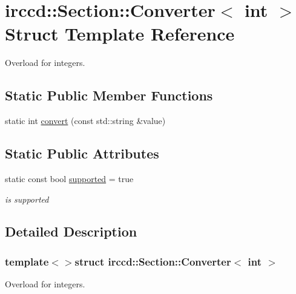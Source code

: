 \hypertarget{a00021}{\section{irccd\-:\-:Section\-:\-:Converter$<$ int $>$ Struct Template Reference}
\label{a00021}
}


Overload for integers.  


\subsection*{Static Public Member Functions}
\begin{DoxyCompactItemize}
\item 
static int \hyperlink{a00021_a17d70ca5872efcbf9d564b29b2ad56dd}{convert} (const std\-::string \&value)
\end{DoxyCompactItemize}
\subsection*{Static Public Attributes}
\begin{DoxyCompactItemize}
\item 
\hypertarget{a00021_a31c6c8933a03ab86a36f37c14e545ce6}{static const bool \hyperlink{a00021_a31c6c8933a03ab86a36f37c14e545ce6}{supported} = true}\label{a00021_a31c6c8933a03ab86a36f37c14e545ce6}

\begin{DoxyCompactList}\small\item\em is supported \end{DoxyCompactList}\end{DoxyCompactItemize}


\subsection{Detailed Description}
\subsubsection*{template$<$$>$struct irccd\-::\-Section\-::\-Converter$<$ int $>$}

Overload for integers. 

